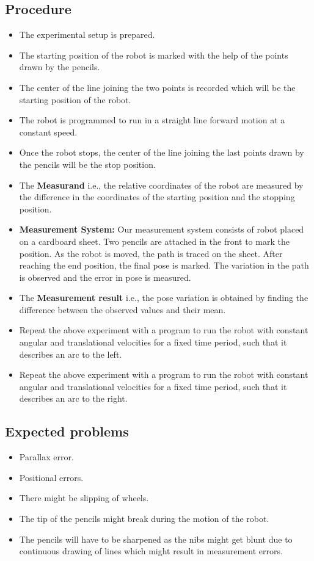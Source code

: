 \documentclass[11pt,a4paper,titlepage]{article}
\begin{document}
\newpage
\subsection{\textbf{Procedure}}
\begin{itemize}
\item The experimental setup is prepared.
\item The starting position of the robot is marked with the help of the points drawn by the pencils.
\item The center of the line joining the two points is recorded which will be the starting position of the robot.
\item The robot is programmed to run in a straight line forward motion at a constant speed.
\item Once the robot stops, the center of the line joining the last points drawn by the pencils will be the stop position.
\item The \textbf{Measurand} i.e., the relative coordinates of the robot are measured by the difference in the coordinates of the starting position and the stopping position.
\item \textbf{Measurement System:} Our measurement system consists of robot placed on a cardboard sheet. Two pencils are attached in the front to mark the position. As the robot is moved, the path is traced on the sheet. After reaching the end position, the final pose is marked. The variation in the path is observed and the error in pose is measured.
\item The \textbf{Measurement result} i.e., the pose variation is obtained by finding the difference between the observed values and their mean.
\item Repeat the above experiment with a program to run the robot with constant angular and translational velocities for a fixed time period, such that it describes an arc to the left.
\item Repeat the above experiment with a program to run the robot with constant angular and translational velocities for a fixed time period, such that it describes an arc to the right.
\end{itemize}
\subsection{\textbf{Expected problems}}
\begin{itemize}
\item Parallax error.
\item Positional errors.
\item There might be slipping of wheels.
\item The tip of the pencils might break during the motion of the robot.
\item The pencils will have to be sharpened as the nibs might get blunt due to continuous drawing of lines which might result in measurement errors.
\end{itemize}
\end{document}
